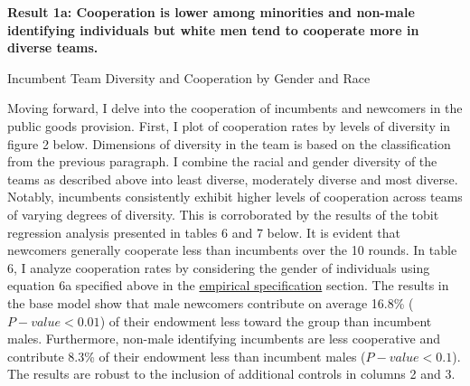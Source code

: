 \textbf{Result 1a: Cooperation is lower among minorities and non-male identifying individuals but white men tend to cooperate more in diverse teams. }

\begin{table}[H]
 \captionsetup{justification=raggedright,singlelinecheck=false}
\caption{Incumbent Team Diversity and Cooperation by Gender and Race} \label{table:3c}
    \begin{center}
        
    \end{center}
\end{table}

\hspace  *{0mm} Moving forward, I delve into the cooperation of incumbents and newcomers in the public goods provision. First, I plot of cooperation rates by levels of diversity in figure 2 below. Dimensions of diversity in the team is based on the classification from the previous paragraph. I combine the racial and gender diversity of the teams as described above into least diverse, moderately diverse and most diverse. Notably, incumbents consistently exhibit higher levels of cooperation across teams of varying degrees of diversity. This is corroborated by the results of the tobit regression analysis presented in tables 6 and 7 below. It is evident that newcomers generally cooperate less than incumbents over the 10 rounds. In table 6, I analyze cooperation rates by considering the gender of individuals using equation 6a specified above in the \hyperref[subsec:Specification]{empirical specification} section. The results in the base model show that male newcomers contribute on average 16.8\% ($P-value<0.01$) of their endowment less toward the group than incumbent males. Furthermore, non-male identifying incumbents are less cooperative and contribute 8.3\% of their endowment less than incumbent males ($P-value<0.1$). The results are robust to the inclusion of additional controls in columns 2 and 3.


